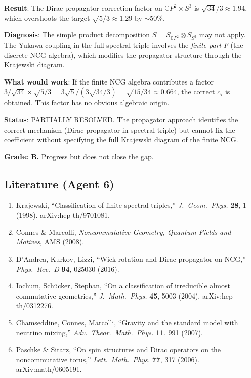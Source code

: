 \documentclass[11pt,a4paper]{article}
\newcommand{\CP}{\mathbb{C}P}
\begin{document}
\begin{tcolorbox}[colback=yellow!5!white, colframe=yellow!60!black, title={Agent 6: $c_\tau$ Dirac Propagator Result}]
\textbf{Result}: The Dirac propagator correction factor on $\CP^2 \times S^3$ is $\sqrt{34}/3 \approx 1.94$, which overshoots the target $\sqrt{5/3} \approx 1.29$ by $\sim 50\%$.

\textbf{Diagnosis}: The simple product decomposition $S = S_{\CP^2} \otimes S_{S^3}$ may not apply. The Yukawa coupling in the full spectral triple involves the \emph{finite part} $F$ (the discrete NCG algebra), which modifies the propagator structure through the Krajewski diagram.

\textbf{What would work}: If the finite NCG algebra contributes a factor $3/\sqrt{34} \times \sqrt{5/3} = 3\sqrt{5}/(3\sqrt{34/3}) = \sqrt{15/34} \approx 0.664$, the correct $c_\tau$ is obtained. This factor has no obvious algebraic origin.

\textbf{Status}: PARTIALLY RESOLVED. The propagator approach identifies the correct mechanism (Dirac propagator in spectral triple) but cannot fix the coefficient without specifying the full Krajewski diagram of the finite NCG.

\textbf{Grade: B.} Progress but does not close the gap.
\end{tcolorbox}

\subsection{Literature (Agent 6)}

\begin{enumerate}
\item Krajewski, ``Classification of finite spectral triples,'' \textit{J.\ Geom.\ Phys.} \textbf{28}, 1 (1998). arXiv:hep-th/9701081.
\item Connes \& Marcolli, \textit{Noncommutative Geometry, Quantum Fields and Motives}, AMS (2008).
\item D'Andrea, Kurkov, Lizzi, ``Wick rotation and Dirac propagator on NCG,'' \textit{Phys.\ Rev.\ D} \textbf{94}, 025030 (2016).
\item Iochum, Sch\"ucker, Stephan, ``On a classification of irreducible almost commutative geometries,'' \textit{J.\ Math.\ Phys.} \textbf{45}, 5003 (2004). arXiv:hep-th/0312276.
\item Chamseddine, Connes, Marcolli, ``Gravity and the standard model with neutrino mixing,'' \textit{Adv.\ Theor.\ Math.\ Phys.} \textbf{11}, 991 (2007).
\item Paschke \& Sitarz, ``On spin structures and Dirac operators on the noncommutative torus,'' \textit{Lett.\ Math.\ Phys.} \textbf{77}, 317 (2006). arXiv:math/0605191.
\end{enumerate}
\end{document}
